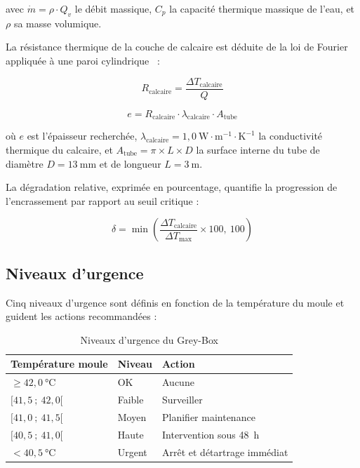 avec \(\dot{m} = \rho \cdot Q_v\) le débit massique, \(C_p\) la capacité thermique massique de l'eau, et \(\rho\) sa masse volumique.

La résistance thermique de la couche de calcaire est déduite de la loi de Fourier appliquée à une paroi cylindrique~\cite{bib24} :

\begin{equation}
R_{\text{calcaire}} = \frac{\Delta T_{\text{calcaire}}}{Q}
\label{eq:resistance}
\end{equation}

\begin{equation}
e = R_{\text{calcaire}} \cdot \lambda_{\text{calcaire}} \cdot A_{\text{tube}}
\label{eq:epaisseur}
\end{equation}

où \(e\) est l'épaisseur recherchée, \(\lambda_{\text{calcaire}} = 1,0~\text{W}\cdot\text{m}^{-1}\cdot\text{K}^{-1}\) la conductivité thermique du calcaire, et \(A_{\text{tube}} = \pi \times L \times D\) la surface interne du tube de diamètre \(D = 13~\text{mm}\) et de longueur \(L = 3~\text{m}\).

La dégradation relative, exprimée en pourcentage, quantifie la progression de l'encrassement par rapport au seuil critique :

\begin{equation}
\delta = \min\left(\frac{\Delta T_{\text{calcaire}}}{\Delta T_{\text{max}}} \times 100,~100\right)
\label{eq:degradation}
\end{equation}

\subsection{Niveaux d'urgence}

Cinq niveaux d'urgence sont définis en fonction de la température du moule et guident les actions recommandées :

\begin{table}[htbp]
\centering
\caption{Niveaux d'urgence du Grey-Box}
\label{tab:urgence}
\begin{tabular}{p{}p{}p{}}
\toprule
\textbf{Température moule} & \textbf{Niveau} & \textbf{Action} \\
\midrule
\(\geq 42,0~\si{\celsius}\) & OK & Aucune \\
\([41,5~;~42,0[\) & Faible & Surveiller \\
\([41,0~;~41,5[\) & Moyen & Planifier maintenance \\
\([40,5~;~41,0[\) & Haute & Intervention sous 48~h \\
\(< 40,5~\si{\celsius}\) & Urgent & Arrêt et détartrage immédiat \\
\bottomrule
\end{tabular}
\end{table}

